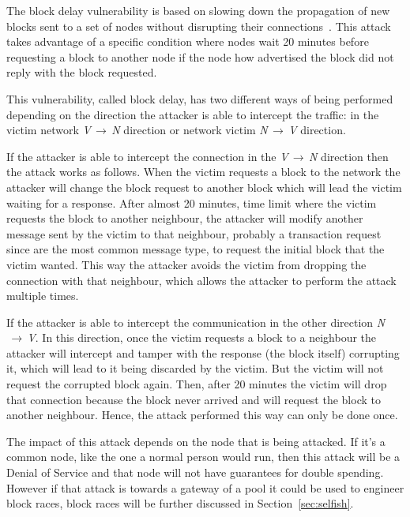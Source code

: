 

The block delay vulnerability is based on slowing down the propagation of new blocks sent to a set of nodes without disrupting their connections~\cite{apostolaki2016hijacking}. This attack takes advantage of a specific condition where nodes wait 20 minutes before requesting a block to another node if the node how advertised the block did not reply with the block requested.

This vulnerability, called block delay, has two different ways of being performed depending on the direction the attacker is able to intercept the traffic: in the victim network \textit{V$\,\to\,$N} direction or network victim \textit{N$\,\to\,$V} direction.

If the attacker is able to intercept the connection in the \textit{V$\,\to\,$N} direction then the attack works as follows. When the victim requests a block to the network the attacker will change the block request to another block which will lead the victim waiting for a response. After almost 20 minutes, time limit where the victim requests the block to another neighbour, the attacker will modify another message sent by the victim to that neighbour, probably a transaction request since are the most common message type, to request the initial block that the victim wanted. This way the attacker avoids the victim from dropping the connection with that neighbour, which allows the attacker to perform the attack multiple times.

If the attacker is able to intercept the communication in the other direction \textit{N$\,\to\,$V}. In this direction, once the victim requests a block to a neighbour the attacker will intercept and tamper with the response (the block itself) corrupting it, which will lead to it being discarded by the victim. But the victim will not request the corrupted block again. Then, after 20 minutes the victim will drop that connection because the block never arrived and will request the block to another neighbour. Hence, the attack performed this way can only be done once.

The impact of this attack depends on the node that is being attacked. If it's a common node, like the one a normal person would run, then this attack will be a Denial of Service and that node will not have guarantees for double spending. However if that attack is towards a gateway of a pool it could be used to engineer block races, block races will be further discussed in Section~\ref{sec:selfish}.

